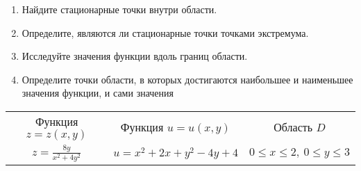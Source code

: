 \begin{enumerate}[label=\Alph*.]
    \begin{enumerate}[label=\arabic*.]
        \item Найдите стационарные точки внутри области.
        \item Определите, являются ли стационарные точки точками экстремума.
        \item Исследуйте значения функции вдоль границ области.
        \item Определите точки области, в которых достигаются наибольшее и наименьшее значения функции, и сами значения
    \end{enumerate}

    \vspace{5mm}

    \begin{tabular}{ccc}
        Функция $z = z(x, y)$                     & Функция $u = u(x, y)$         & Область $D$                          \\
        $\displaystyle z = \frac{8y}{x^2 + 4y^2}$ & $u = x^2 + 2x + y^2 - 4y + 4$ & $0 \leq x \leq 2, \ 0 \leq y \leq 3$
    \end{tabular}
\end{enumerate}

\clearpage
